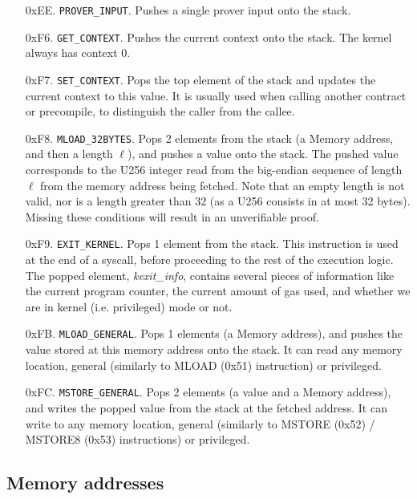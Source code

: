 \begin{enumerate}[align=left]
  \item[0xEE.] \texttt{PROVER\_INPUT}. Pushes a single prover input onto the stack.

  \item[0xF6.] \texttt{GET\_CONTEXT}. Pushes the current context onto the stack. The kernel always has context 0.

  \item[0xF7.] \texttt{SET\_CONTEXT}. Pops the top element of the stack and updates the current context to this value. It is usually used when calling another contract or precompile,
  to distinguish the caller from the callee.

  \item[0xF8.] \texttt{MLOAD\_32BYTES}. Pops 2 elements from the stack (a Memory address, and then a length $\ell$), and pushes
  a value onto the stack. The pushed value corresponds to the U256 integer read from the big-endian sequence of length $\ell$ from the memory address being fetched. Note that an
  empty length is not valid, nor is a length greater than 32 (as a U256 consists in at most 32 bytes). Missing these conditions will result in an unverifiable proof.

  \item[0xF9.] \texttt{EXIT\_KERNEL}. Pops 1 element from the stack. This instruction is used at the end of a syscall, before proceeding to the rest of the execution logic.
  The popped element, \textit{kexit\_info}, contains several pieces of information like the current program counter, the current amount of gas used, and whether we are in kernel (i.e. privileged) mode or not.

  \item[0xFB.] \texttt{MLOAD\_GENERAL}. Pops 1 elements (a Memory address), and pushes the value stored at this memory
  address onto the stack. It can read any memory location, general (similarly to MLOAD (0x51) instruction) or privileged.

  \item[0xFC.] \texttt{MSTORE\_GENERAL}. Pops 2 elements (a value and a Memory address), and writes the popped value from
  the stack at the fetched address. It can write to any memory location, general (similarly to MSTORE (0x52) / MSTORE8 (0x53) instructions) or privileged.
\end{enumerate}


\subsection{Memory addresses}
\label{memoryaddresses}

